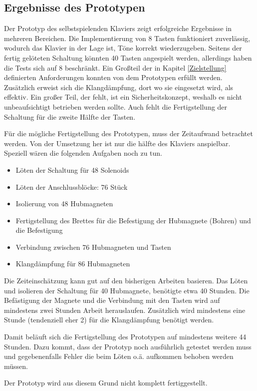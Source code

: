 \subsection{Ergebnisse des Prototypen}
Der Prototyp des selbstspielenden Klaviers zeigt erfolgreiche Ergebnisse in mehreren Bereichen. Die Implementierung von
8 Tasten funktioniert zuverlässig, wodurch das Klavier in der Lage ist, Töne korrekt wiederzugeben. Seitens der
fertig gelöteten Schaltung könnten 40 Tasten angespielt werden, allerdings haben die Tests sich auf 8 beschränkt.
Ein Großteil der in Kapitel \ref{Zielstellung} definierten Anforderungen konnten von dem Prototypen erfüllt werden.
Zusätzlich erweist sich die Klangdämpfung, dort wo sie eingesetzt wird, als effektiv. \newline
Ein großer Teil, der fehlt, ist ein Sicherheitskonzept, weshalb es nicht unbeaufsichtigt betrieben
werden sollte.
Auch fehlt die Fertigstellung der Schaltung für die zweite Hälfte der Tasten.

Für die mögliche Fertigstellung des Prototypen, muss der Zeitaufwand betrachtet werden.
Von der Umsetzung her ist nur die hälfte des Klaviers anspielbar. Speziell wären die folgenden Aufgaben noch zu tun.
\begin{itemize}
    \item Löten der Schaltung für 48 Solenoids
    \item Löten der Anschlussblöcke: 76 Stück
    \item Isolierung von 48 Hubmagneten
    \item Fertigstellung des Brettes für die Befestigung der Hubmagnete (Bohren) und die Befestigung %
    \item Verbindung zwischen 76 Hubmagneten und Tasten
    \item Klangdämpfung für 86 Hubmagneten
\end{itemize}

Die Zeiteinschätzung kann gut auf den bisherigen Arbeiten basieren. Das Löten und isolieren der Schaltung für
40 Hubmagnete, benötigte etwa 40 Stunden. Die Befästigung der Magnete und die Verbindung mit den Tasten wird auf
mindestens zwei Stunden Arbeit herauslaufen.
Zusätzlich wird mindestens eine Stunde (tendenziell eher 2) für die Klangdämpfung benötigt werden.

Damit beläuft sich die Fertigstellung des Prototypen auf mindestens weitere 44 Stunden. Dazu kommt, dass der Prototyp
noch ausführlich getestet werden muss und gegebenenfalls Fehler die beim Löten o.ä. aufkommen behoben werden müssen.

Der Prototyp wird aus diesem Grund nicht komplett fertiggestellt.


